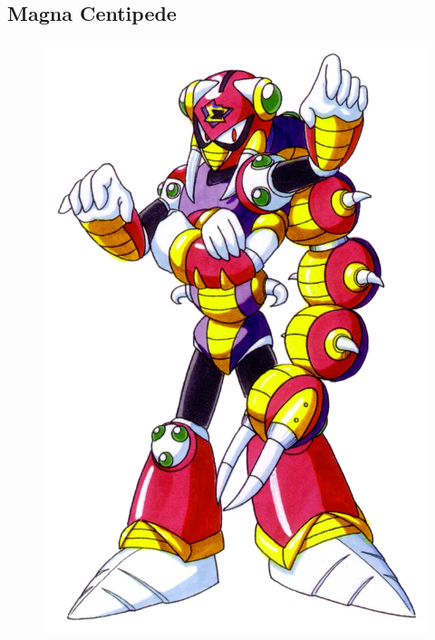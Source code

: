 \subsection{Magna Centipede}\label{boss:Magna_centipede}
\begin{figure}[htp]
	\centering
	\includegraphics[height=\portraitsize]{figures/X2/Magna_centipede/Magna_Centipede.png}

\end{figure}
